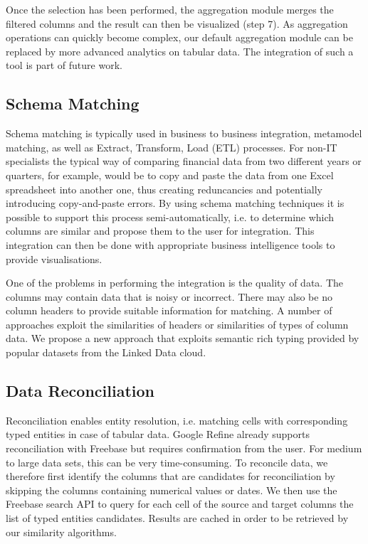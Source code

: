 \documentclass{../../Util/LaTEX/sig-alternate}
\begin{document}
Once the selection has been performed, the aggregation module merges the filtered columns and the result can then be visualized (step 7). As aggregation operations can quickly become complex, our default aggregation module can be replaced by more advanced analytics on tabular data. The integration of such a tool is part of future work.

\subsection{Schema Matching }
Schema matching is typically used in business to business integration, metamodel matching, as well as Extract, Transform, Load (ETL) processes. For non-IT specialists the typical way of comparing financial data from two different years or quarters, for example, would be to copy and paste the data from one Excel spreadsheet into another one, thus creating reduncancies and potentially introducing copy-and-paste errors. By using schema matching techniques it is possible to support this process semi-automatically, i.e. to determine which columns are similar and propose them to the user for integration. This integration can then be done with appropriate business intelligence tools to provide visualisations.

One of the problems in performing the integration is the quality of data. The columns may contain data that is noisy or incorrect. There may also be no column headers to provide suitable information for matching. A number of approaches exploit the similarities of headers or similarities of types of column data. We propose a new approach that exploits semantic rich typing provided by popular datasets from the Linked Data cloud.


\subsection{Data Reconciliation}
Reconciliation enables entity resolution, i.e. matching cells with corresponding typed entities in case of tabular data. Google Refine already supports reconciliation with Freebase but requires confirmation from the user. For medium to large data sets, this can be very time-consuming. To reconcile data, we therefore first identify the columns that are candidates for reconciliation by skipping the columns containing numerical values or dates. We then use the Freebase search API to query for each cell of the source and target columns the list of typed entities candidates. Results are cached in order to be retrieved by our similarity algorithms.
\end{document}
